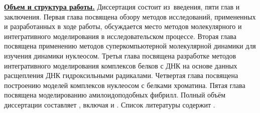 \underline{\textbf{Объем и структура работы.}} Диссертация состоит из~введения, пяти глав и заключения.
Первая глава посвящена обзору методов исследований, примененных и разработанных в ходе работы, обсуждается место методов молекулярного и интегративного моделирования в исследовательском процессе. Вторая глава посвящена применению методов суперкомпьютерной молекулярной динамики для изучения динамики нуклеосом.  Третья глава посвящена разработке методов интегративного моделирования комплексов белков с ДНК на основе данных расщепления ДНК гидроксильными радикалами. Четвертая глава посвящена построению моделей комплексов нуклеосом с белками хроматина. Пятая глава посвящена моделированию амилоидоподобных фибрилл.
%
Полный объём диссертации составляет
, включая
 и
.
Список литературы содержит
.

